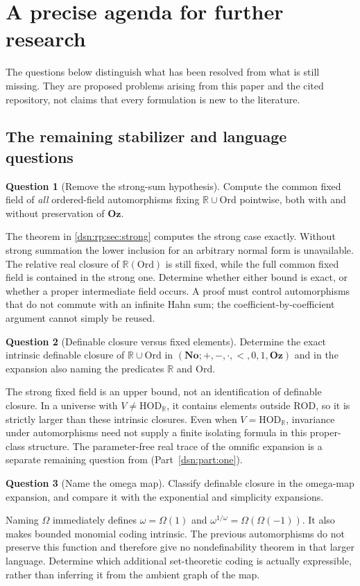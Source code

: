 \documentclass[11pt,a4paper]{article}
\numberwithin{equation}{section}
\theoremstyle{definition}
\newtheorem{question}[question]{Question}
\theoremstyle{remark}
\newcommand{\No}{\mathbf{No}}
\newcommand{\Oz}{\mathbf{Oz}}
\newcommand{\Ord}{\mathrm{Ord}}
\newcommand{\HOD}{\mathrm{HOD}}
\newcommand{\R}{\mathbb R}
\newcommand{\ROD}{\mathrm{ROD}}
\newcommand{\HR}{\HOD_{\R}}
\begin{document}
\section{A precise agenda for further research}
\label{dsn:rp:sec:agenda}

The questions below distinguish what has been resolved from what is
still missing. They are proposed problems arising from this paper and
the cited repository, not claims that every formulation is new to the
literature.

\subsection{The remaining stabilizer and language questions}

\begin{question}[Remove the strong-sum hypothesis]\label{dsn:rp:q:nonstrong}
Compute the common fixed field of \emph{all} ordered-field
automorphisms fixing $\R\cup\Ord$ pointwise, both with and without
preservation of $\Oz$.
\end{question}
The theorem in \cref{dsn:rp:sec:strong} computes the strong case exactly.
Without strong summation the lower inclusion for an arbitrary normal
form is unavailable. The relative real closure of $\R(\Ord)$ is still
fixed, while the full common fixed field is contained in the strong
one. Determine whether either bound is exact, or whether a proper
intermediate field occurs. A proof must control automorphisms that do
not commute with an infinite Hahn sum; the coefficient-by-coefficient
argument cannot simply be reused.

\begin{question}[Definable closure versus fixed elements]
Determine the exact intrinsic definable closure of $\R\cup\Ord$ in
$(\No;+,-,\cdot,<,0,1,\Oz)$ and in the expansion also naming the
predicates $\R$ and $\Ord$.
\end{question}
The strong fixed field is an upper bound, not an identification of
definable closure. In a universe with $V\ne\HR$, it contains elements
outside $\ROD$, so it is strictly larger than these intrinsic closures.
Even when $V=\HR$, invariance under automorphisms need not supply a
finite isolating formula in this proper-class structure. The
parameter-free real trace of the omnific expansion is a separate
remaining question from (Part~\ref{dsn:part:one}).

\begin{question}[Name the omega map]
Classify definable closure in the omega-map expansion, and compare it
with the exponential and simplicity expansions.
\end{question}
Naming $\Omega$ immediately defines $\omega=\Omega(1)$ and
$\omega^{1/\omega}=\Omega(\Omega(-1))$. It also makes bounded
monomial coding intrinsic. The previous automorphisms do not preserve
this function and therefore give no nondefinability theorem in that
larger language. Determine which additional set-theoretic coding is
actually expressible, rather than inferring it from the ambient graph
of the map.
\end{document}

